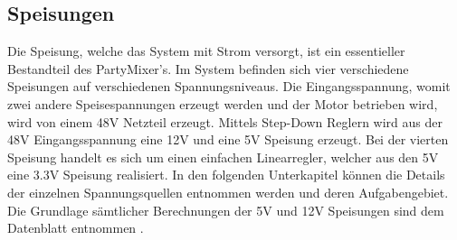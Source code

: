\subsection{Speisungen}
\label{subsec:Speisungen}

Die Speisung, welche das System mit Strom versorgt, ist ein essentieller Bestandteil des PartyMixer's. Im System befinden sich vier verschiedene Speisungen auf verschiedenen Spannungsniveaus. Die Eingangsspannung, womit zwei andere Speisespannungen erzeugt werden und der Motor betrieben wird, wird von einem 48V Netzteil erzeugt. Mittels Step-Down Reglern wird aus der 48V Eingangsspannung eine 12V und eine 5V Speisung erzeugt. Bei der vierten Speisung handelt es sich um einen einfachen Linearregler, welcher aus den 5V eine 3.3V Speisung realisiert. In den folgenden Unterkapitel können die Details der einzelnen Spannungsquellen entnommen werden und deren Aufgabengebiet. Die Grundlage sämtlicher Berechnungen der 5V und 12V Speisungen sind dem Datenblatt entnommen \cite[S.10]{monolithic_power_systems_mp24943_2011}.